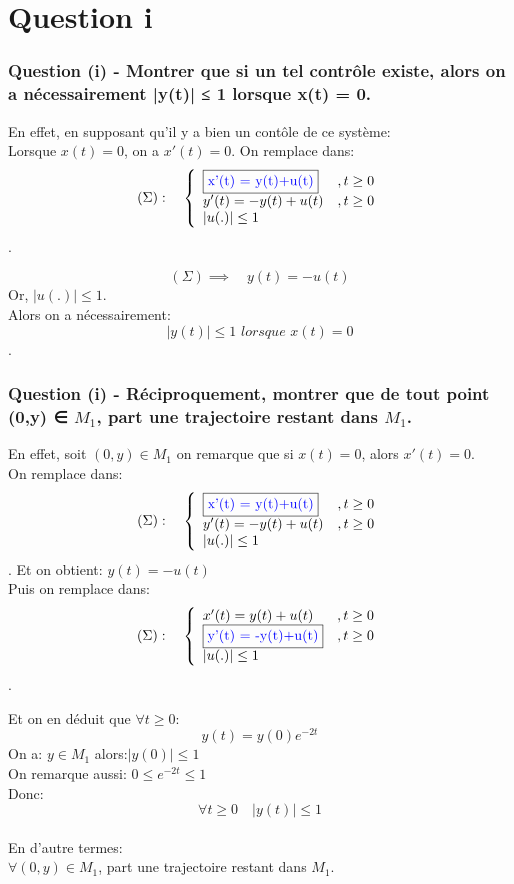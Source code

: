 \documentclass[xcolor=dvipsnames]{beamer}
\begin{document}
\section{Question i}
\begin {frame}
  \frametitle{Question (i) - Montrer que si un tel contrôle existe, alors on a nécessairement |y(t)| ≤ 1 lorsque x(t) = 0.}
En effet, en supposant qu'il y a bien un contôle de ce système: \\
Lorsque $x(t)= 0$, on a $x'(t) = 0$. 
On remplace dans: $$(\Sigma): \quad \left\lbrace\begin{array}{ll}
\fbox{\color{blue}{x'(t) = y(t)+u(t)}} & ,t\geq 0\\
y'(t) = -y(t)+u(t) & ,t\geq 0\\
{|u(.)| \leq 1}
\end{array}\right.$$.

$$(\Sigma) \implies \quad y(t) = -u(t)$$
Or, $|u(.)| \leq 1 $.\\
Alors on a nécessairement: $$|y(t)| ≤ 1 \,\, lorsque \,\, x(t) = 0$$.
 
\end {frame}
\begin{frame}
\frametitle{Question (i) -  Réciproquement, montrer que de tout point (0,y) ∈ $M_1$, part une trajectoire restant dans $M_1$.}
En effet, soit $(0,y) \in M_1$
on remarque que si $x(t)= 0$, alors  $x'(t) = 0$. \\
On remplace dans: $$(\Sigma): \quad \left\lbrace\begin{array}{ll}
\fbox{\color{blue}{x'(t) = y(t)+u(t)}} & ,t\geq 0\\
y'(t) = -y(t)+u(t) & ,t\geq 0\\
{|u(.)| \leq 1}
\end{array}\right.$$.
Et on obtient: $y(t) = -u(t)$ \\
Puis on remplace dans: $$(\Sigma): \quad \left\lbrace\begin{array}{ll}
x'(t) = y(t)+u(t) & ,t\geq 0\\
\fbox{\color{blue}{y'(t) = -y(t)+u(t)}} & ,t\geq 0\\
{|u(.)| \leq 1}
\end{array}\right.$$.
 
\end {frame}
\begin{frame}
Et on en déduit que $\forall t \geq 0$:
$$y(t) = y(0)e^{-2t}$$
On a:  $y \in M_1$ alors:$|y(0)| \leq 1 $ \\
On remarque aussi: $0 \leq e^{-2t} \leq 1$ \\
Donc:  $$\forall t \geq 0 \quad |y(t)| \leq 1$$\\
En d'autre termes: \\
$\forall (0,y) ∈ M_1$, part une trajectoire restant dans $M_1$.
 
\end {frame}
\end{document}
